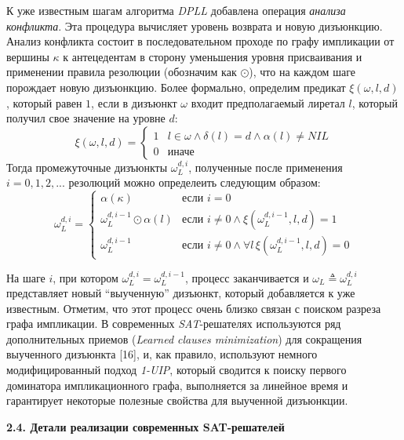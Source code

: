 К уже известным шагам алгоритма \textit{DPLL} добавлена операция \textit{анализа конфликта}. 
Эта процедура вычисляет уровень возврата и новую дизъюнкцию. Анализ конфликта состоит в последовательном проходе по графу импликации от вершины $\kappa$ к антецедентам в сторону уменьшения уровня присваивания и применении правила резолюции (обозначим как $\odot$), что на каждом шаге порождает новую дизъюнкцию. Более формально, определим предикат $\xi(\omega, l, d)$, который равен $1$, если в дизъюнкт $\omega$ входит предполагаемый лиретал $l$, который получил свое значение на уровне $d$:
\begin{equation*}
\xi(\omega, l, d) = 
\begin{cases}
1 & l \in \omega \land \delta(l) = d \land \alpha(l) \ne NIL \\
0 & \text{иначе}
\end{cases}
\end{equation*}
Тогда промежуточные дизъюнкты $\omega_{L}^{d,i}$, полученные после применения $i=0,1,2,...$ резолюций можно определеить следующим образом:
\begin{equation*}
\omega_{L}^{d,i} = 
\begin{cases}
\alpha(\kappa) & \text{если } i = 0 \\
\omega_{L}^{d,i-1} \odot \alpha(l) & \text{если } i \ne 0 \land \xi(\omega_{L}^{d,i-1}, l, d) = 1 \\
\omega_{L}^{d,i-1} & \text{если } i \ne 0 \land \forall l \, \xi(\omega_{L}^{d,i-1}, l, d) = 0
\end{cases}
\end{equation*}

На шаге $i$, при котором $\omega_{L}^{d,i} = \omega_{L}^{d,i-1}$, процесс заканчивается и $\omega_{L} \triangleq \omega_{L}^{d,i}$ представляет новый \enquote{выученную} дизъюнкт, который добавляется к уже известным.
Отметим, что этот процесс очень близко связан с поиском разреза графа импликации. В современных \textit{SAT}-решателях используются ряд дополнительных приемов (\textit{Learned clauses minimization}) для сокращения выученного дизъюнкта [16], и, как правило, используют немного модифицированный подход \textit{1-UIP}, который сводится к поиску первого доминатора импликационного графа, выполняется за линейное время и гарантирует некоторые полезные свойства для выученной дизъюнкции.

\vspace{5pt}
\textbf{2.4. Детали реализации современных SAT-решателей}\label{chapters:2.4}
\vspace{5pt}

